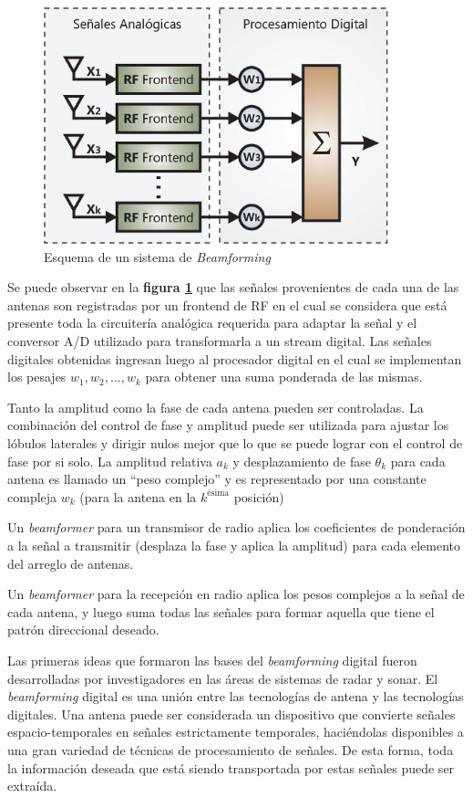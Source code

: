 \begin{figure}[htb!]
        \centering
        \includegraphics[width=10cm]{./figures/C02-beamforming}
        \caption{Esquema de un sistema de \textit{Beamforming}}
        \label{fig:Beamforming}
\end{figure}

Se puede observar en la \textbf{figura \ref{fig:Beamforming}} que las señales provenientes de cada una de las antenas son registradas por un frontend de RF en el cual se considera que está presente toda la circuitería analógica requerida para adaptar la señal y el conversor A/D utilizado para transformarla a un stream digital. Las señales digitales obtenidas ingresan luego al procesador digital en el cual se implementan los pesajes $w_1, w_2, ..., w_k$ para obtener una suma ponderada de las mismas.

Tanto la amplitud como la fase de cada antena pueden ser controladas. La combinación del control de fase y amplitud puede ser utilizada para ajustar los lóbulos laterales y dirigir nulos mejor que lo que se puede lograr con el control de fase por si solo. La amplitud relativa $a_k$ y desplazamiento de fase $\theta_k$ para cada antena es llamado un ``peso complejo'' y es representado por una constante compleja $w_k$ (para la antena en la $k^{\text{ésima}}$ posición)

Un \textit{beamformer} para un transmisor de radio aplica los coeficientes de ponderación a la señal a transmitir (desplaza la fase y aplica la amplitud) para cada elemento del arreglo de antenas.

Un \textit{beamformer} para la recepción en radio aplica los pesos complejos a la señal de cada antena, y luego suma todas las señales para formar aquella que tiene el patrón direccional deseado.

Las primeras ideas que formaron las bases del \textit{beamforming} digital fueron desarrolladas por investigadores en las áreas de sistemas de radar y sonar. El \textit{beamforming} digital es una unión entre las tecnologías de antena y las tecnologías digitales. Una antena puede ser considerada un dispositivo que convierte señales espacio-temporales en señales estrictamente temporales, haciéndolas disponibles a una gran variedad de técnicas de procesamiento de señales. De esta forma, toda la información deseada que está siendo transportada por estas señales puede ser extraída.

